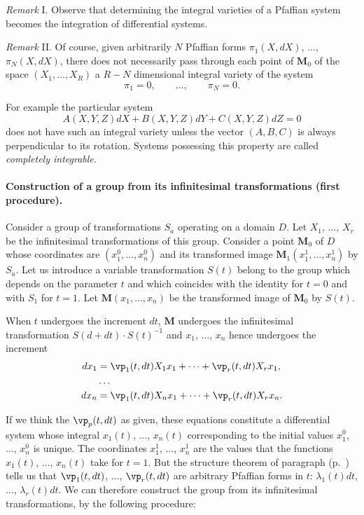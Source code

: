 \somespace

\emph{Remark} I. Observe that determining the integral varieties of a Pfaffian system becomes the integration of differential systems.

\somespace

\emph{Remark} II. Of course, given arbitrarily $N$ Pfaffian forms $\pi_{1}(X,dX)$, $\dots$, $\pi_{N}(X,dX)$, there does not necessarily pass through each point of $\mathbf{M}_{0}$ of the space $(X_{1},\dots,X_{R})$ a $R-N$ dimensional integral variety of the system
\[
\pi_{1}=0,\qquad\dots,\qquad\pi_{N}=0.
\]

For example the particular system
\[
A(X,Y,Z)dX+B(X,Y,Z)dY+C(X,Y,Z)dZ=0
\]
does not have such an integral variety unless the vector $(A,B,C)$ is always perpendicular to its rotation. Systems possessing this property are called \emph{completely integrable.}

\paragraph{Construction of a group from its infinitesimal transformations (first procedure).}
\label{sec:85}
Consider a group of transformations $S_{a}$ operating on a domain $D$. Let $X_{1}$, $\dots$, $X_{r}$ be the infinitesimal transformations of this group. Consider a point $\mathbf{M}_{0}$ of $D$ whose coordinates are $(x_{1}^{0},\dots,x_{n}^{0})$ and its transformed image $\mathbf{M}_{1}(x^{1}_{1},\dots,x_{n}^{1})$ by $S_{a}$. Let us introduce a variable transformation $S(t)$ belong to the group which depends on  the parameter $t$ and which coincides with the identity for $t=0$ and with $S_{1}$ for $t=1$. Let $\mathbf{M}(x_{1},\dots,x_{n})$ be the transformed image of $\mathbf{M}_{0}$ by $S(t)$.

When $t$ undergoes the increment $dt$, $\mathbf{M}$ undergoes the infinitesimal transformation $S(d+dt)\cdot S(t)^{-1}$ and $x_{1}$, $\dots$, $x_{n}$ hence undergoes the increment
\begin{align*}
  dx_{1}&=\vp_{1}(t,dt)X_{1}x_{1}+\dots+\vp_{r}(t,dt)X_{r}x_{1},\\
  &\dots\\
  dx_{n}&=\vp_{1}(t,dt)X_{n}x_{1}+\dots+\vp_{r}(t,dt)X_{r}x_{n}.
\end{align*}

If we think the $\vp_{p}(t,dt)$ as given, these equations constitute a differential system whose integral $x_{1}(t)$, $\dots$, $x_{n}(t)$ corresponding to the initial values $x_{1}^{0}$, $\dots$, $x_{n}^{0}$ is unique. The coordinates $x_{1}^{1}$, $\dots$, $x_{n}^{1}$ are the values that the functions $x_{1}(t)$, $\dots$, $x_{n}(t)$ take for $t=1$. But the structure theorem of paragraph  (p.~\pageref{sec:77}) tells us that $\vp_{1}(t,dt)$, $\dots$, $\vp_{r}(t,dt)$ are arbitrary Pfaffian forms in $t$: $\lambda_{1}(t)dt$, $\dots$, $\lambda_{r}(t)dt$. We can therefore construct the group from its infinitesimal transformations, by the following procedure:

